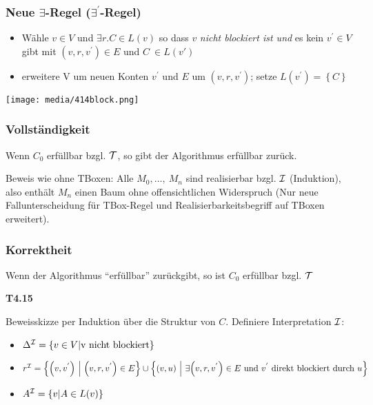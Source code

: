 \subsubsection{\texorpdfstring{Neue $\exists$-Regel
($\exists^{'}$-Regel)}{Neue \textbackslash{}exists-Regel (\textbackslash{}exists\^{}\{'\}-Regel)}}\label{neue-exists-regel-exists-regel}

\begin{itemize}
\item
  Wähle $v \in V$ und $\exists r.C \in L\left( v \right)$ so dass
  $v$ \emph{nicht blockiert ist und} es kein $v^{'} \in V$ gibt mit
  $\left( v,r,v^{'} \right) \in E$ und $C\  \in L\left( v' \right)$
\item
  erweitere V um neuen Konten $v^{'}$ und $E$ um
  $\left( v,r,v^{'} \right)$; setze
  $L\left( v^{'} \right) = \left\{ C \right\}$
\end{itemize}

\texttt{[image: media/414block.png]}

\subsubsection{Vollständigkeit}\label{vollstuxe4ndigkeit}

\begin{proposition}
Wenn $C_0$ erfüllbar bzgl. $\mathcal{T}$, so gibt der Algorithmus erfüllbar zurück.
\end{proposition}

Beweis wie ohne TBoxen: Alle $M_{0},\ldots,\ M_{n}$ sind realisierbar
bzgl. $\mathcal{I}$ (Induktion), also enthält $M_{n}$ einen Baum ohne
offensichtlichen Widerspruch (Nur neue Fallunterscheidung für TBox-Regel und Realisierbarkeitsbegriff auf TBoxen erweitert).

\subsubsection{Korrektheit}\label{korrektheit}

\begin{proposition}
    Wenn der Algorithmus \enquote{erfüllbar} zurückgibt, so ist $C_0$ erfüllbar bzgl. $\mathcal{T}$
\end{proposition}

\textbf{T4.15}

Beweisskizze per Induktion über die Struktur von $C$. Definiere
Interpretation $\mathcal{I}$:

\begin{itemize}
\item
  $\Delta^\MI = \left\{ v \in V \middle| \text{v\ }\mathrm{\text{nicht\ blockiert}} \right\}$
\item
  $r^\MI = \left\{ \left( v,v^{'} \right)\  \middle| \ \left( v,r,v^{'} \right) \in E \right\} \cup \left\{ \left( v,u \right)\  \middle| \ \exists\left( v,r,v^{'} \right) \in E\mathrm{\ }\mathrm{\text{und}}\mathrm{\ }v^{'}\mathrm{\ }\mathrm{\text{direkt\ blockiert\ durch}}\mathrm{\ }u \right\}$
\item
  $A^\MI = \left\{ v \middle| A \in L\left( v \right) \right\}$
\end{itemize}

